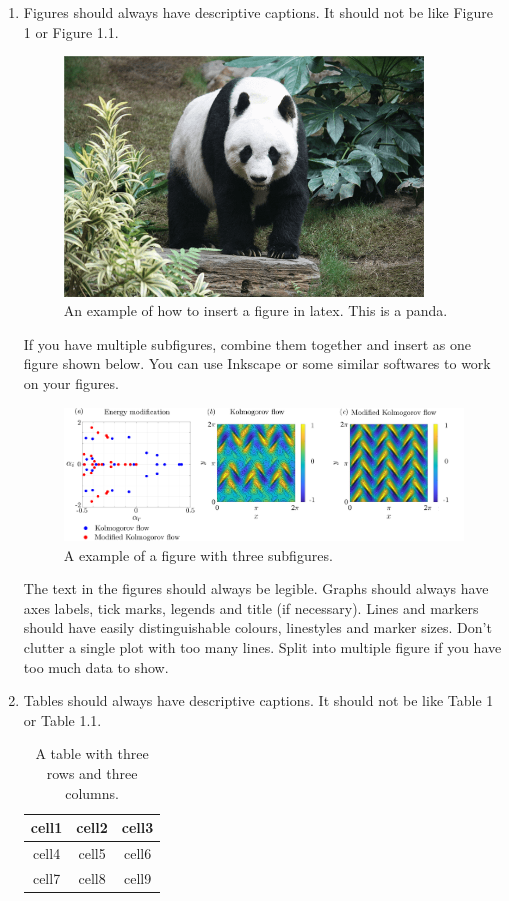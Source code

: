 \documentclass{article}
\begin{document}
\begin{enumerate}
\item Figures should always have descriptive captions. It should not be like Figure 1 or Figure 1.1. 
\begin{figure}[H]
\centering
\includegraphics[width=0.9\textwidth]{figures/fig1.png}
\caption{An example of how to insert a figure in latex. This is a panda.}
\end{figure}

If you have multiple subfigures, combine them together and insert as one figure shown below. You can use Inkscape or some similar softwares to work on your figures.

\begin{figure}[H]
\centering
\includegraphics[width=\textwidth]{figures/EigenValues.png}
\caption{A example of a figure with three subfigures.}
\end{figure}

The text in the figures should always be legible. Graphs should always have axes labels, tick marks, legends and title (if necessary). Lines and markers should have easily distinguishable colours, linestyles and marker sizes. Don't clutter a single plot with too many lines. Split into multiple figure if you have too much data to show.

\item Tables should always have descriptive captions. It should not be like Table 1 or Table 1.1. 
\begin{table}[H]
\centering
\caption{A table with three rows and three columns.} \vspace{0.1in}
\begin{tabular}{ |c|c|c| } 
 \hline
 cell1 & cell2 & cell3 \\ \hline
 cell4 & cell5 & cell6 \\ 
 cell7 & cell8 & cell9 \\ 
 \hline
\end{tabular}
\end{table}


\end{enumerate}
\end{document}
